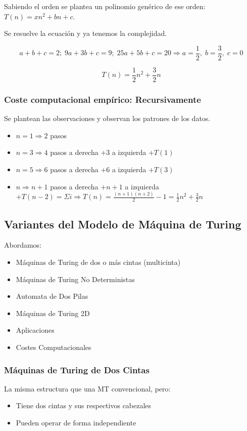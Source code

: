 Sabiendo el orden se plantea un polinomio genérico de ese orden: $T(n)=xn^2+bn+c$.

Se resuelve la ecuación y ya tenemos la complejidad.

$$a+b+c=2;\; 9a+3b+c=9;\; 25a+5b+c=20 \Rightarrow a=\frac{1}{2},\; b=\frac{3}{2},\; c=0$$

$$T(n)=\frac{1}{2}n^2+\frac{3}{2}n$$

\subsubsection{Coste computacional empírico: Recursivamente}
Se plantean las observaciones y observan los patrones de los datos.

\begin{itemize}
    \item $n=1 \Rightarrow 2$ pasos
    \item $n=3 \Rightarrow 4$ pasos a derecha $+ 3$ a izquierda $+ T(1)$
    \item $n=5 \Rightarrow 6$ pasos a derecha $+ 6$ a izquierda $+ T(3)$
    \item $n \Rightarrow n+1$ pasos a derecha $+ n+1$ a izquierda $+ T(n-2) = \Sigma i \Rightarrow T(n)=\frac{(n+1)(n+2)}{2}-1=\frac{1}{2}n^2+\frac{3}{2}n$ 
\end{itemize}

\subsection{Variantes del Modelo de Máquina de Turing}
Abordamos:
\begin{itemize}
    \item Máquinas de Turing de dos o más cintas (multicinta)
    \item Máquinas de Turing No Deterministas
    \item Automata de Dos Pilas
    \item Máquinas de Turing 2D
    \item Aplicaciones
    \item Costes Computacionales
\end{itemize}

\subsubsection{Máquinas de Turing de Dos Cintas}
La misma estructura que una MT convencional, pero:
\begin{itemize}
    \item Tiene dos cintas y sus respectivos cabezales
    \item Pueden operar de forma independiente
\end{itemize}

